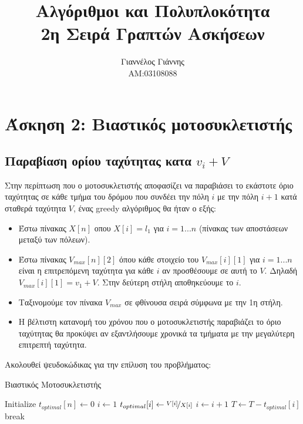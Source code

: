 \documentclass[a4paper,12pt]{report}
\title{ Αλγόριθμοι και Πολυπλοκότητα \\ 2η Σειρά Γραπτών Ασκήσεων}
\author{Γιαννέλος Γιάννης\\ΑΜ:03108088}
\begin{document}
\maketitle

\section*{Άσκηση 2: Βιαστικός μοτοσυκλετιστής}
\subsection*{Παραβίαση ορίου ταχύτητας κατα $v_i+V$}
Στην περίπτωση που ο μοτοσυκλετιστής αποφασίζει να παραβιάσει το εκάστοτε όριο ταχύτητας σε κάθε τμήμα του δρόμου που συνδέει την πόλη $i$ με την πόλη $i+1$ κατά σταθερά ταχύτητα $V$, ένας greedy αλγόριθμος θα ήταν ο εξής:

\begin{itemize}
 \item Έστω πίνακας $X[n]$ οπου $X[i]=l_1$ για $i=1...n$ (πίνακας των αποστάσεων μεταξύ των πόλεων). 
 \item Έστω πίνακας $V_{max}[n][2]$ όπου κάθε στοιχείο του $V_{max}[i][1]$ για $i=1...n$ είναι η επιτρεπόμενη ταχύτητα για κάθε $i$ αν προσθέσουμε σε αυτή το $V$. Δηλαδή $V_{max}[i][1]=v_1+V$. Στην δεύτερη στήλη αποθηκεύουμε το $i$.
 \item Ταξινομούμε τον πίνακα $V_{max}$ σε φθίνουσα σειρά σύμφωνα με την 1η στήλη.
 \item Η βέλτιστη κατανομή του χρόνου που ο μοτοσυκλετιστής παραβιάζει το όριο ταχύτητας θα προκύψει αν εξαντλήσουμε χρονικά τα τμήματα με την μεγαλύτερη επιτρεπτή ταχύτητα.  
\end{itemize}

Ακολουθεί ψευδοκώδικας για την επίλυση του προβλήματος:

\begin{algorithm}
\caption{Βιαστικός Μοτοσυκλετιστής}
\begin{algorithmic}[1]
  \State Initialize $t_{optimal}[n] \gets 0$	
  \State $i \gets 1$
      \State $t_{optimal}[i] \gets \nicefrac{V[i]}{X[i]}$
      \State $i \gets i+1$
      \State $T \gets T - t_{optimal}[i]$
    \Else
      \State break
    \EndIf
    
  \EndFor
\end{algorithmic}
\end{algorithm}
\end{document}
